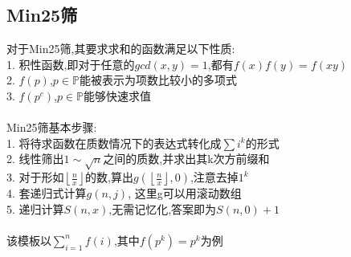 \documentclass[twocolumn,a4]{article}
\begin{document}
\subsection{Min25筛}
对于Min25筛,其要求求和的函数满足以下性质:\\
1. 积性函数,即对于任意的$gcd(x,y)=1$,都有$f(x)f(y)=f(xy)$\\
2. $f(p)$,$p\in \mathbb{P} $能被表示为项数比较小的多项式\\
3. $f(p^{c})$,$p\in \mathbb{P}$能够快速求值\\
\\
Min25筛基本步骤:\\
1. 将待求函数在质数情况下的表达式转化成$ \sum i^{k} $的形式\\
2. 线性筛出$1\sim \sqrt{n} $之间的质数,并求出其k次方前缀和\\
3. 对于形如$\left\lfloor \frac{n}{x}  \right\rfloor $的数,算出$g(\left\lfloor \frac{n}{x}  \right\rfloor,0)$,注意去掉$1^{k}$\\
4. 套递归式计算$g(n,j)$, 这里g可以用滚动数组\\
5. 递归计算$S(n,x)$,无需记忆化,答案即为$S(n,0)+1$\\
\\
该模板以$\sum_{i=1}^{n}f(i)$,其中$f(p^{k})=p^{k}$为例\\
\end{document}
